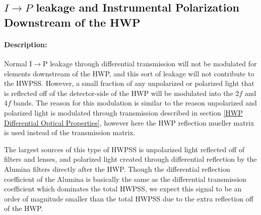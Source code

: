 \subsection{$I\rightarrow P$ leakage and Instrumental Polarization Downstream of the HWP}
\label{IP downstream of HWP}
\paragraph{Description:}
Normal I$\rightarrow$P leakage through differential transmission will not be modulated for elements downstream of the HWP, and this sort of leakage will not contribute to the HWPSS. 
However, a small fraction of any unpolarized or polarized light that is reflected off of the detector-side of the HWP will be modulated into the 2$f$ and 4$f$ bands.
The reason for this modulation is similar to the reason unpolarized and polarized light is modulated through transmission described in section \ref{HWP Differential Optical Properties}, however here the HWP reflection mueller matrix is used instead of the transmission matrix.

The largest sources of this type of HWPSS is unpolarized light reflected off of filters and lenses, and polarized light created through differential reflection by the Alumina filters directly after the HWP. 
Though the differential reflection coefficient of the Alumina is basically the same as the differential transmission coefficient which dominates the total HWPSS, we expect this signal to be an order of magnitude smaller than the total HWPSS due to the extra reflection off of the HWP.







